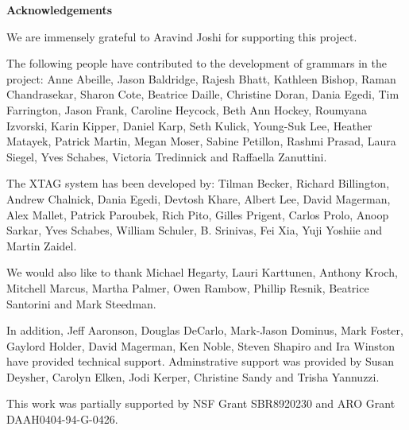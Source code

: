 \pagestyle{plain}
\null\vfil
\begin{center}
{\bf Acknowledgements}
\end{center}
\setcounter{page}{0}

We are immensely grateful to Aravind Joshi for supporting this
project. 

The following people have contributed to the development of grammars
in the project: Anne Abeille, Jason Baldridge, Rajesh Bhatt, Kathleen
Bishop, Raman Chandrasekar, Sharon Cote, Beatrice Daille, Christine
Doran, Dania Egedi, Tim Farrington, Jason Frank, Caroline Heycock,
Beth Ann Hockey, Roumyana Izvorski, Karin Kipper, Daniel Karp, Seth
Kulick, Young-Suk Lee, Heather Matayek, Patrick Martin, Megan Moser,
Sabine Petillon, Rashmi Prasad, Laura Siegel, Yves Schabes, Victoria
Tredinnick and Raffaella Zanuttini.

The XTAG system has been developed by: Tilman Becker, Richard
Billington, Andrew Chalnick, Dania Egedi, Devtosh Khare, Albert Lee,
David Magerman, Alex Mallet, Patrick Paroubek, Rich Pito, Gilles
Prigent, Carlos Prolo, Anoop Sarkar, Yves Schabes, William Schuler,
B. Srinivas, Fei Xia, Yuji Yoshiie and Martin Zaidel.

We would also like to thank Michael Hegarty, Lauri Karttunen, Anthony
Kroch, Mitchell Marcus, Martha Palmer, Owen Rambow, Phillip Resnik,
Beatrice Santorini and Mark Steedman.

In addition, Jeff Aaronson, Douglas DeCarlo, Mark-Jason Dominus, Mark
Foster, Gaylord Holder, David Magerman, Ken Noble, Steven Shapiro and
Ira Winston have provided technical support.  Adminstrative support
was provided by Susan Deysher, Carolyn Elken, Jodi Kerper, Christine
Sandy and Trisha Yannuzzi.

This work was partially supported by  NSF Grant SBR8920230 and ARO Grant
DAAH0404-94-G-0426. 

\newpage


